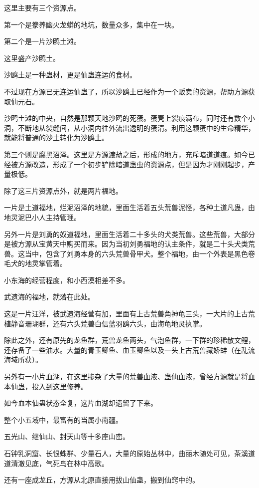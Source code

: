 \begin{this_body}
这里主要有三个资源点。

第一个是豢养幽火龙蟒的地坑，数量众多，集中在一块。

第二个是一片沙鸥土滩。

这里盛产沙鸥土。

沙鸥土是一种蛊材，更是仙蛊连运的食材。

不过现在方源已无连运仙蛊了，所以沙鸥土已经作为一个贩卖的资源，帮助方源获取仙元石。

沙鸥土滩的中央，自然是那颗天地沙鸥的死蛋。蛋壳上裂痕满布，同时还有数个小洞，不断地从裂缝间，从小洞内往外流出透明的蛋清。利用这颗蛋中的生命精华，就能将普通的沙土转化为沙鸥土。

第三个则是腐黑沼泽。这里是方源渡劫之后，形成的地方，充斥暗道道痕。如今已经被方源改造，形成了一个初步铲除暗道蛊虫的资源点，但是因为才刚刚起步，产量极低。

除了这三片资源点外，就是两片福地。

一片是土道福地，烂泥沼泽的地貌，里面生活着五头荒兽泥怪，各种土道凡蛊，由地灵泥巴小人主持管理。

另外一片是刘勇的奴道福地，里面生活着二十多头的犬类荒兽。这些荒兽，大部分是被方源从宝黄天中购买而来。因为当初刘勇福地的认主条件，就是二十头犬类荒兽。这当中，包含了刘勇本身的六头荒兽骨甲犬。整个福地，由一个外表是黑色卷毛犬的地灵掌管着。

小东海的经营程度，和小西漠相差不多。

武遗海的福地，就落在此处。

这是一片汪洋，被武遗海经营有加，里面有上古荒兽角神龟三头，一大片的上古荒植静音珊瑚群，还有六头荒兽白信蓝羽鸥六头，由海龟地灵执掌。

除此之外，还有原先的龙鱼群，荒兽龙鱼两头，气泡鱼群，一下群的珍稀散文鲤，还存备了一些油水。大量的青玉鲫鱼、血玉鲫鱼以及一头上古荒兽藏娇蚌（在乱流海域所获）。

另外有一小片血湖，在这里掺杂了大量的荒兽血液、蛊仙血液，曾经方源就是将血本仙蛊，投入到这里修养。

如今血本仙蛊状态全复，这片血湖却遗留了下来。

整个小五域中，最富有的当属小南疆。

五光山、继仙山、封天山等十多座山峦。

石钟乳洞窟、长恨蛛群、少量石人，大量的原始丛林中，曲丽木随处可见，茶溪道道清澈见底，气死鸟在林中高歌。

还有一座成龙丘，方源从北原直接用拔山仙蛊，搬到仙窍中的。


\end{this_body}
